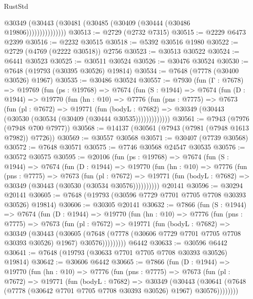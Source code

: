 \begin{lexlean}{RustStd}
\begin{coremodule}
{\begin{coremodule}
{{{{{{{{{{{{{{{{{{{{{{{{{{{{{{{{{{{{{{{{{{{{{{{{{{{{{                    @30349 (@30443 (@30481 (@30485 (@30409 (@30444 (@30486 @19806)))))))))))))))
@30513 := @2729 (@2732 @7315)
@30515 := @2229 @6473 @2399
@30516 := @2232 @30515
@30518 := @5392 @30516 @1980
@30522 := @2729 (@4769 (@2222 @30518)) @2756
@30523 := @30513 @30522
@30524 := @6441 @30523
@30525 := @30511 @30524
@30526 := @30476 @30524
@30530 := @7648 (@19793 (@30395 @30526) @19814)
@30534 := @7648 (@7778 (@30400 @30526) @1967)
@30535 := @30486 @30524
@30557 := @7930
    (fun (Γ : @7678) =>
    @19769
      (fun (ps : @19768) =>
      @7674
        (fun (S : @1944) =>
        @7674
          (fun (D : @1944) =>
          @19770
            (fun (hn : @10) =>
            @7776
              (fun (pns : @7775) =>
              @7673
                (fun (pl : @7672) =>
                @19771
                  (fun (bodyL : @7682) =>
                  @30349 (@30443 (@30530 (@30534 (@30409 (@30444 @30535)))))))))))))
@30561 := @7943 (@7976 (@7948 @700 @7977))
@30568 := @14137 (@30561 (@7943 (@7981 (@7948 @1613 @7982)) @7726))
@30569 := @30557 @30568
@30571 := @30407 (@7739 @30568)
@30572 := @7648 @30571
@30575 := @7746 @30568 @24547 @30535
@30576 := @30572 @30575
@30595 := @20106
    (fun (ps : @19768) =>
    @7674
      (fun (S : @1944) =>
      @7674
        (fun (D : @1944) =>
        @19770
          (fun (hn : @10) =>
          @7776
            (fun (pns : @7775) =>
            @7673
              (fun (pl : @7672) =>
              @19771 (fun (bodyL : @7682) => @30349 (@30443 (@30530 (@30534 @30576))))))))))
    @20141
@30596 := @30294 @20141
@30605 := @7648 (@19793 (@30596 @7729 @7701 @7705 @7708 @30393 @30526) @19814)
@30606 := @30305 @20141
@30632 := @7866
    (fun (S : @1944) =>
    @7674
      (fun (D : @1944) =>
      @19770
        (fun (hn : @10) =>
        @7776
          (fun (pns : @7775) =>
          @7673
            (fun (pl : @7672) =>
            @19771
              (fun (bodyL : @7682) =>
              @30349
                (@30443
                  (@30605
                    (@7648
                      (@7778 (@30606 @7729 @7701 @7705 @7708 @30393 @30526) @1967)
                      @30576)))))))))
    @6442
@30633 := @30596 @6442
@30641 := @7648 (@19793 (@30633 @7701 @7705 @7708 @30393 @30526) @19814)
@30642 := @30606 @6442
@30665 := @7866
    (fun (D : @1944) =>
    @19770
      (fun (hn : @10) =>
      @7776
        (fun (pns : @7775) =>
        @7673
          (fun (pl : @7672) =>
          @19771
            (fun (bodyL : @7682) =>
            @30349
              (@30443
                (@30641 (@7648 (@7778 (@30642 @7701 @7705 @7708 @30393 @30526) @1967) @30576))))))))
}}}}}}}}}}}}}}}}}}}}}}}}}}}}}}}}}}}}}}}}}}}}}}}}}}}}}
\end{coremodule}}
\end{coremodule}
\end{lexlean}

